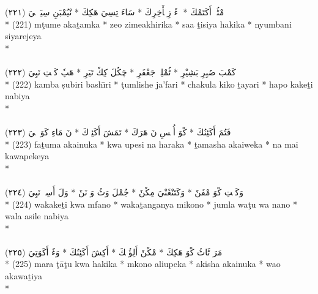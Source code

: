\documentclass[a4paper, 12pt]{report}
\begin{document}
\begin{center}
\textarabic{(٢٢١) \textcolor{mygreen}{مْٹُمٖ أَكَتَمْكَ  * زٖءٗ زِمٖأَخِرِكَ  * سَاءَ تِسِيَ هَكِكَ  * نْيُمْبَنِ سِيَرٖجٖيَ }} \\* 
(221) mţume akaṯamka  * zeo zimeakhirika  * saa ṯisiya hakika  * nyumbani siyarejeya  \\* 
 \\ 
\\[8mm] 

\textarabic{(٢٢٢) \textcolor{mygreen}{كَمْبَ صُبِرِ بَشِيْرِ  * ٹُمْلِشٖ جَعْفَرِ  * چَكُلَ كِكٗ تَيَرِ  * هَپٗ كَكٖتِ نَبِيَ }} \\* 
(222) kamba ṣubiri bashı̄ri  * ţumlishe ja'fari  * chakula kiko ṯayari  * hapo kakeṯi nabiya  \\* 
 \\ 
\\[8mm] 

\textarabic{(٢٢٣) \textcolor{mygreen}{فَتُمَ أَكَئِنُكَ  * كْوَ أُپٖسِ نَ هَرَكَ  * تَمَشَ أَكَئِوٖكَ  * نَ مَاءِ كَوَپٖكٖيَ }} \\* 
(223) faṯuma akainuka  * kwa upesi na haraka  * ṯamasha akaiweka  * na mai kawapekeya  \\* 
 \\ 
\\[8mm] 

\textarabic{(٢٢٤) \textcolor{mygreen}{وَكَكٖتِ كْوَ مْفَنٗ  * وَكَتَنْڠَنْيَ مِكٗنٗ  * جُمْلَ وَٹُ وَ نَنٗ  * وَلَ أَسِلٖ نَبِيَ }} \\* 
(224) wakakeṯi kwa mfano  * wakaṯanganya mikono  * jumla waţu wa nano  * wala asile nabiya  \\* 
 \\ 
\\[8mm] 

\textarabic{(٢٢٥) \textcolor{mygreen}{مَرَ ٹَاٹُ كْوَ هَكِكَ  * مْكٗنٗ أَلِؤُپٖكَ  * أَكِشَ أَكَئِنُكَ  * وَءٗ أَكَوَتِيَ }} \\* 
(225) mara ţāţu kwa hakika  * mkono aliupeka  * akisha akainuka  * wao akawaṯiya  \\* 
 \\ 
\\[8mm] 


\end{center}
\end{document}
